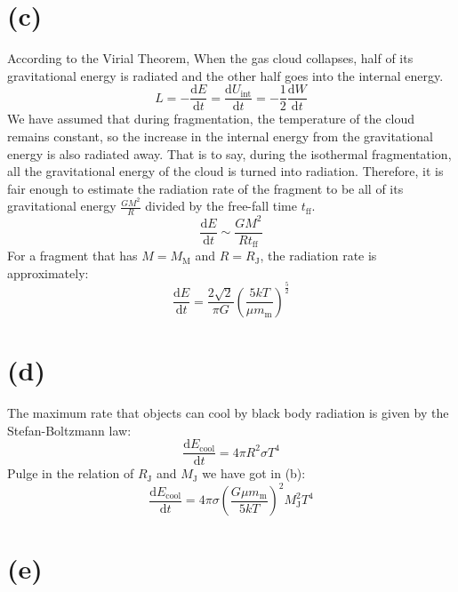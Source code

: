 \documentclass[a4paper,12pt]{article}
\renewcommand{\d}{\mathrm{d}}
\begin{document}
\section*{(c)}
According to the Virial Theorem, When the gas cloud collapses, half of its gravitational energy 
is radiated and the other half goes into the internal energy.
\begin{equation*}
    L = -\frac{\d E}{\d t} = \frac{\d U_{\text{int}}}{\d t} =-\frac{1}{2} \frac{\d W}{\d t}
\end{equation*}
We have assumed that during fragmentation, the temperature of the cloud remains constant, so the 
increase in the internal energy from the gravitational energy is also radiated away. That is to say, 
during the isothermal fragmentation, all the gravitational energy of the cloud is turned into radiation. 
Therefore, it is fair enough to estimate the radiation rate of the fragment to be all of its gravitational 
energy $\frac{GM^2}{R}$ divided by the free-fall time $t_{\text{ff}}$.
\begin{equation*}
    \frac{\d E}{\d t} \sim \frac{GM^2}{Rt_{\text{ff}}}
\end{equation*}
For a fragment that has $M = M_{\text{M}}$ and $R = R_{\text{J}}$, the radiation rate is approximately:
\begin{equation*}
    \frac{\d E}{\d t} = \frac{2\sqrt{2}}{\pi G} (\frac{5kT}{\mu m_{\text{m}}})^{\frac{5}{2}}
\end{equation*}

\section*{(d)}
The maximum rate that objects can cool by black body radiation is given by the Stefan-Boltzmann law:
\begin{equation*}
    \frac{\d E_{\text{cool}}}{\d t} = 4\pi R^2 \sigma T^4 
\end{equation*}
Pulge in the relation of $R_\text{J}$ and $M_\text{J}$ we have got in (b):
\begin{equation*}
    \frac{\d E_{\text{cool}}}{\d t} = 4\pi \sigma (\frac{G\mu m_\text{m}}{5kT})^2 M_\text{J}^2 T^4
\end{equation*}

\section*{(e)}
\end{document}
